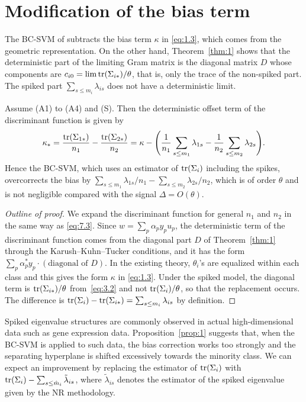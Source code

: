 \section{Modification of the bias term}
\label{sec:bias}

The BC-SVM of \citet{nakayama2017} subtracts the bias term $\kappa$ in
\eqref{eq:1.3}, which comes from the geometric representation. On the other hand,
Theorem~\ref{thm:1} shows that the deterministic part of the limiting Gram matrix
is the diagonal matrix $D$ whose components are $c_{i0}=\lim\operatorname{tr}(\Sigma_{i*})/\theta$,
that is, only the trace of the non-spiked part. The spiked part
$\sum_{s\le m_i}\lambda_{is}$ does not have a deterministic limit.

\begin{proposition}
\label{prop:1}
Assume \textup{(A1)} to \textup{(A4)} and \textup{(S)}. Then the deterministic
offset term of the discriminant function is given by
\[
\kappa_*=\frac{\operatorname{tr}(\Sigma_{1*})}{n_1}-\frac{\operatorname{tr}(\Sigma_{2*})}{n_2}
=\kappa-\Biggl(
\frac{1}{n_1}\sum_{s\le m_1}\lambda_{1s}
-\frac{1}{n_2}\sum_{s\le m_2}\lambda_{2s}
\Biggr).
\]
Hence the BC-SVM, which uses an estimator of $\operatorname{tr}(\Sigma_i)$ including the spikes,
overcorrects the bias by
$\sum_{s\le m_1}\lambda_{1s}/n_1-\sum_{s\le m_2}\lambda_{2s}/n_2$, which is of
order $\theta$ and is not negligible compared with the signal $\Delta=O(\theta)$.
\end{proposition}

\begin{proof}[Outline of proof]
We expand the discriminant function for general $n_1$ and $n_2$ in the same way as
\eqref{eq:7.3}. Since $w=\sum_p\alpha_p y_p u_p$, the deterministic term of the
discriminant function comes from the diagonal part $D$ of Theorem~\ref{thm:1}
through the Karush--Kuhn--Tucker conditions, and it has the form
$\sum_p\alpha_p^* y_p\cdot(\text{diagonal of }D)$. In the existing theory,
$\theta_i$'s are equalized within each class and this gives the form $\kappa$ in
\eqref{eq:1.3}. Under the spiked model, the diagonal term is
$\operatorname{tr}(\Sigma_{i*})/\theta$ from~\eqref{eq:3.2} and not $\operatorname{tr}(\Sigma_i)/\theta$, so
that the replacement occurs. The difference is
$\operatorname{tr}(\Sigma_i)-\operatorname{tr}(\Sigma_{i*})=\sum_{s\le m_i}\lambda_{is}$ by definition.
\end{proof}

\begin{remark}
\label{rem:6}
Spiked eigenvalue structures are commonly observed in actual high-dimensional data
such as gene expression data. Proposition~\ref{prop:1} suggests that, when the
BC-SVM is applied to such data, the bias correction works too strongly and the
separating hyperplane is shifted excessively towards the minority class. We can
expect an improvement by replacing the estimator of $\operatorname{tr}(\Sigma_i)$ with
$\operatorname{tr}(\Sigma_i)-\sum_{s\le\hat m_i}\tilde\lambda_{is}$, where $\tilde\lambda_{is}$
denotes the estimator of the spiked eigenvalue given by the NR methodology.
\end{remark}
